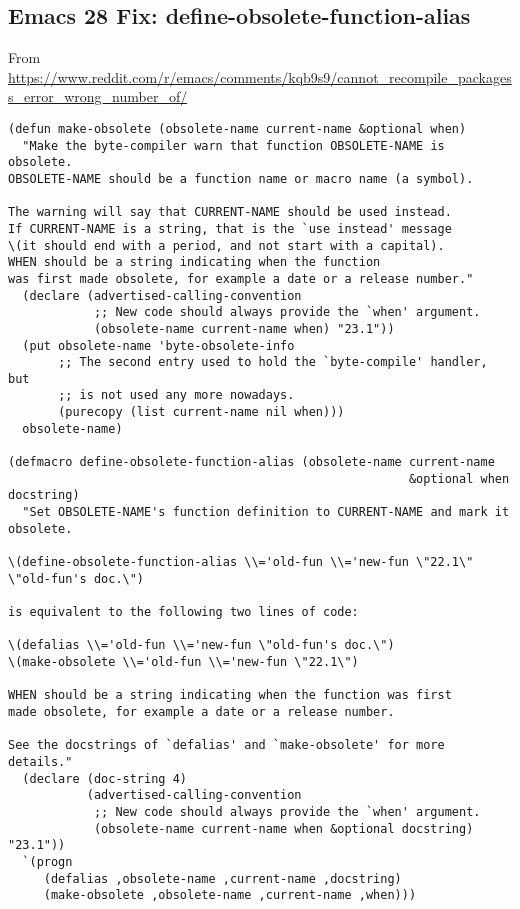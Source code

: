\documentclass[8pt]{article}
\begin{document}
\subsection{Emacs 28 Fix: define-obsolete-function-alias}
\label{sec:orgcfee300}
From \url{https://www.reddit.com/r/emacs/comments/kqb9s9/cannot\_recompile\_packagess\_error\_wrong\_number\_of/}
\begin{verbatim}
(defun make-obsolete (obsolete-name current-name &optional when)
  "Make the byte-compiler warn that function OBSOLETE-NAME is obsolete.
OBSOLETE-NAME should be a function name or macro name (a symbol).

The warning will say that CURRENT-NAME should be used instead.
If CURRENT-NAME is a string, that is the `use instead' message
\(it should end with a period, and not start with a capital).
WHEN should be a string indicating when the function
was first made obsolete, for example a date or a release number."
  (declare (advertised-calling-convention
            ;; New code should always provide the `when' argument.
            (obsolete-name current-name when) "23.1"))
  (put obsolete-name 'byte-obsolete-info
       ;; The second entry used to hold the `byte-compile' handler, but
       ;; is not used any more nowadays.
       (purecopy (list current-name nil when)))
  obsolete-name)

(defmacro define-obsolete-function-alias (obsolete-name current-name
                                                        &optional when docstring)
  "Set OBSOLETE-NAME's function definition to CURRENT-NAME and mark it obsolete.

\(define-obsolete-function-alias \\='old-fun \\='new-fun \"22.1\" \"old-fun's doc.\")

is equivalent to the following two lines of code:

\(defalias \\='old-fun \\='new-fun \"old-fun's doc.\")
\(make-obsolete \\='old-fun \\='new-fun \"22.1\")

WHEN should be a string indicating when the function was first
made obsolete, for example a date or a release number.

See the docstrings of `defalias' and `make-obsolete' for more details."
  (declare (doc-string 4)
           (advertised-calling-convention
            ;; New code should always provide the `when' argument.
            (obsolete-name current-name when &optional docstring) "23.1"))
  `(progn
     (defalias ,obsolete-name ,current-name ,docstring)
     (make-obsolete ,obsolete-name ,current-name ,when)))


\end{verbatim}
\end{document}
